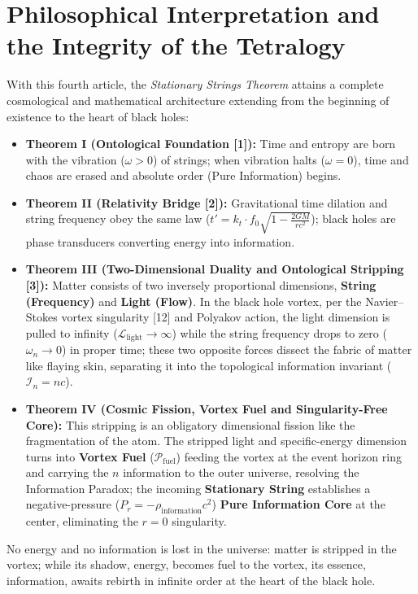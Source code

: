 \documentclass[12pt,a4paper]{article}
\begin{document}
\section{Philosophical Interpretation and the Integrity of the Tetralogy}

With this fourth article, the \textit{Stationary Strings Theorem} attains a complete cosmological and mathematical architecture extending from the beginning of existence to the heart of black holes:

\begin{itemize}
    \item \textbf{Theorem I (Ontological Foundation [1]):} Time and entropy are born with the vibration ($\omega > 0$) of strings; when vibration halts ($\omega = 0$), time and chaos are erased and absolute order (Pure Information) begins.
    \item \textbf{Theorem II (Relativity Bridge [2]):} Gravitational time dilation and string frequency obey the same law ($t' = k_t \cdot f_0 \sqrt{1 - \frac{2GM}{rc^2}}$); black holes are phase transducers converting energy into information.
    \item \textbf{Theorem III (Two-Dimensional Duality and Ontological Stripping [3]):} Matter consists of two inversely proportional dimensions, \textbf{String (Frequency)} and \textbf{Light (Flow)}. In the black hole vortex, per the Navier--Stokes vortex singularity [12] and Polyakov action, the light dimension is pulled to infinity ($\mathcal{L}_{\text{light}} \to \infty$) while the string frequency drops to zero ($\omega_n \to 0$) in proper time; these two opposite forces dissect the fabric of matter like flaying skin, separating it into the topological information invariant ($\mathcal{I}_n = n c$).
    \item \textbf{Theorem IV (Cosmic Fission, Vortex Fuel and Singularity-Free Core):} This stripping is an obligatory dimensional fission like the fragmentation of the atom. The stripped light and specific-energy dimension turns into \textbf{Vortex Fuel} ($\mathcal{P}_{\text{fuel}}$) feeding the vortex at the event horizon ring and carrying the $n$ information to the outer universe, resolving the Information Paradox; the incoming \textbf{Stationary String} establishes a negative-pressure ($P_r = -\rho_{\text{information}}c^2$) \textbf{Pure Information Core} at the center, eliminating the $r=0$ singularity.
\end{itemize}

No energy and no information is lost in the universe: matter is stripped in the vortex; while its shadow, energy, becomes fuel to the vortex, its essence, information, awaits rebirth in infinite order at the heart of the black hole.
\end{document}

